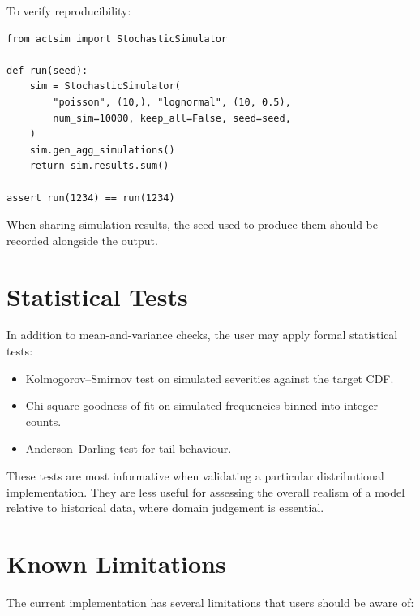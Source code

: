To verify reproducibility:

\begin{lstlisting}[style=pythonstyle]
from actsim import StochasticSimulator

def run(seed):
    sim = StochasticSimulator(
        "poisson", (10,), "lognormal", (10, 0.5),
        num_sim=10000, keep_all=False, seed=seed,
    )
    sim.gen_agg_simulations()
    return sim.results.sum()

assert run(1234) == run(1234)
\end{lstlisting}

When sharing simulation results, the seed used to produce them should
be recorded alongside the output.

\section{Statistical Tests}

In addition to mean-and-variance checks, the user may apply formal
statistical tests:

\begin{itemize}[leftmargin=*]
    \item Kolmogorov--Smirnov test on simulated severities against the
          target CDF.
    \item Chi-square goodness-of-fit on simulated frequencies binned
          into integer counts.
    \item Anderson--Darling test for tail behaviour.
\end{itemize}

These tests are most informative when validating a particular
distributional implementation. They are less useful for assessing the
overall realism of a model relative to historical data, where domain
judgement is essential.

\section{Known Limitations}

The current implementation has several limitations that users should be
aware of:

